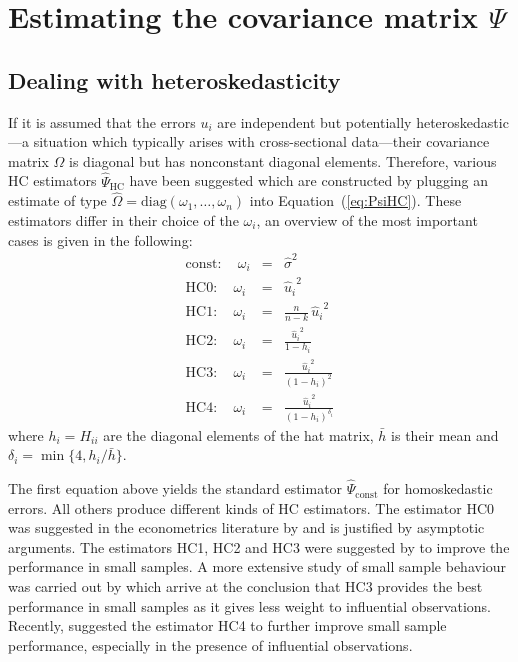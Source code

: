 \documentclass{Z}
\begin{document}
\section[Estimating the covariance matrix]{Estimating the covariance matrix $\Psi$}
\label{sec:estimating}

\subsection{Dealing with heteroskedasticity}

If it is assumed that the errors $u_i$ are independent but
potentially heteroskedastic---a situation which typically arises with
cross-sectional data---their covariance matrix $\Omega$ is diagonal
but has nonconstant diagonal elements. Therefore, various HC estimators
$\hat \Psi_{\mathrm{HC}}$ have been suggested which are constructed
by plugging an estimate of type $\hat \Omega = \mathrm{diag}(\omega_1, \dots, \omega_n)$
into Equation~(\ref{eq:PsiHC}). These estimators differ in their
choice of the $\omega_i$, an overview of the most important cases
is given in the following:
\begin{eqnarray*}
  \mathrm{const:} \quad \omega_i & = & \hat \sigma^2 \\
    \mathrm{HC0:} \quad \omega_i & = & {\hat u_i}^2 \\
    \mathrm{HC1:} \quad \omega_i & = & \frac{n}{n-k} \, {\hat u_i}^2 \\
    \mathrm{HC2:} \quad \omega_i & = & \frac{{\hat u_i}^2}{1 - h_i} \\
    \mathrm{HC3:} \quad \omega_i & = & \frac{{\hat u_i}^2}{(1 - h_i)^2} \\
    \mathrm{HC4:} \quad \omega_i & = & \frac{{\hat u_i}^2}{(1 - h_i)^{\delta_i}}
\end{eqnarray*}
where $h_i = H_{ii}$ are the diagonal elements of the hat matrix, $\bar h$ is
their mean and $\delta_i = \min\{4, h_i/\bar h\}$.

The first equation above yields the standard estimator $\hat \Psi_{\mathrm{const}}$
for homoskedastic errors. All others produce different kinds of HC estimators.
The estimator HC0 was suggested in the econometrics literature by \cite{hac:White:1980}
and is justified by asymptotic arguments. %
The estimators HC1, HC2 and HC3 were suggested by \cite{hac:MacKinnon+White:1985}
to improve the performance in small samples. A more extensive study
of small sample behaviour was carried out by \cite{hac:Long+Ervin:2000}
which arrive at the conclusion that HC3 provides the best performance
in small samples as it gives less weight to influential observations.
Recently, \cite{hac:Cribari-Neto:2004} suggested the estimator HC4
to further improve small sample performance, especially in the presence
of influential observations.
\end{document}
